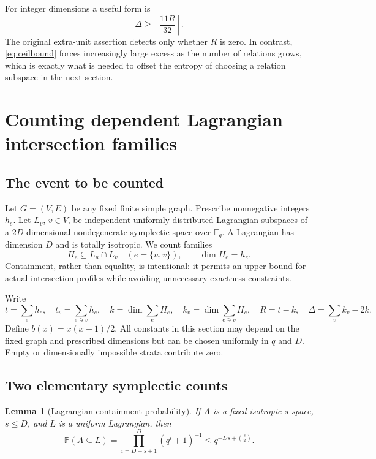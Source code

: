 \documentclass[11pt]{article}
\newtheorem{lemma}[theorem]{Lemma}
\theoremstyle{definition}
\theoremstyle{remark}
\newcommand{\Pp}{\mathbb P}
\newcommand{\Fq}{\mathbb F_q}
\newcommand{\1}{\mathbf 1}
\begin{document}
For integer dimensions a useful form is
\begin{equation}
 \Delta\ge\left\lceil\frac{11R}{32}\right\rceil.
 \label{eq:ceilbound}
\end{equation}
The original extra-unit assertion detects only whether $R$ is zero. In
contrast, \eqref{eq:ceilbound} forces increasingly large excess as the number
of relations grows, which is exactly what is needed to offset the entropy of
choosing a relation subspace in the next section.

\section{Counting dependent Lagrangian intersection families}
\label{sec:counting}

\subsection{The event to be counted}

Let $G=(V,E)$ be any fixed finite simple graph. Prescribe nonnegative integers
$h_e$. Let $L_v$, $v\in V$, be independent uniformly distributed Lagrangian
subspaces of a $2D$-dimensional nondegenerate symplectic space over $\Fq$.
A Lagrangian has dimension $D$ and is totally isotropic.
We count families
\begin{equation}
 H_e\subseteq L_u\cap L_v\quad(e=\{u,v\}),\qquad \dim H_e=h_e.
 \label{eq:containment}
\end{equation}
Containment, rather than equality, is intentional: it permits an upper bound
for actual intersection profiles while avoiding unnecessary exactness
constraints.

Write
\begin{equation}
 t=\sum_e h_e,\quad t_v=\sum_{e\ni v}h_e,\quad
 k=\dim\sum_eH_e,\quad k_v=\dim\sum_{e\ni v}H_e,
 \quad R=t-k,\quad \Delta=\sum_v k_v-2k.
 \label{eq:countparameters}
\end{equation}
Define $b(x)=x(x+1)/2$. All constants in this section may depend on the fixed
graph and prescribed dimensions but can be chosen uniformly in $q$ and $D$.
Empty or dimensionally impossible strata contribute zero.

\subsection{Two elementary symplectic counts}

\begin{lemma}[Lagrangian containment probability]
\label{lem:lagcount}
If $A$ is a fixed isotropic $s$-space, $s\le D$, and $L$ is a uniform
Lagrangian, then
\begin{equation}
 \Pp(A\subseteq L)=\prod_{i=D-s+1}^{D}(q^i+1)^{-1}
 \le q^{-Ds+\binom{s}{2}}.
 \label{eq:lagprob}
\end{equation}
\end{lemma}
\end{document}
